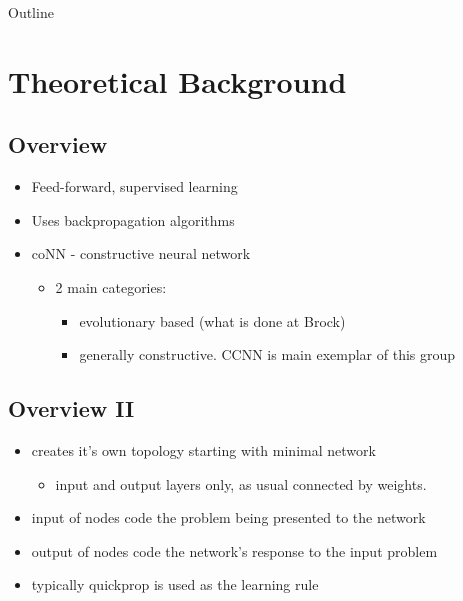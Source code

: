 \documentclass[presentation]{beamer}
\author{Will Rempel}
\date{\today}
\title{}
\begin{document}
\begin{frame}{Outline}
\tableofcontents
\end{frame}

\section{Theoretical Background}
\label{sec:orgeb84d66}
\subsection{Overview}
\label{sec:org9345558}
\begin{itemize}
\item Feed-forward, supervised learning
\item Uses backpropagation algorithms
\item coNN - constructive neural network
\begin{itemize}
\item 2 main categories:
\begin{itemize}
\item evolutionary based (what is done at Brock)
\item generally constructive. CCNN is main exemplar of this group
\end{itemize}
\end{itemize}
\end{itemize}
\subsection{Overview II}
\label{sec:orgb89dcee}
\begin{itemize}
\item creates it's own topology starting with minimal network
\begin{itemize}
\item input and output layers only, as usual connected by weights.
\end{itemize}
\item input of nodes code the problem being presented to the network
\item output of nodes code the network's response to the input problem
\item typically quickprop is used as the learning rule
\end{itemize}
\end{document}
